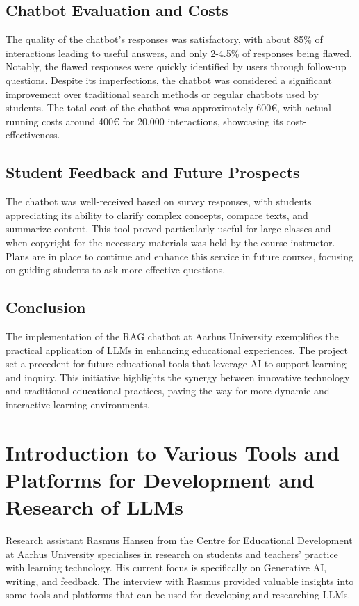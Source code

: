     \subsection*{Chatbot Evaluation and Costs}

    The quality of the chatbot's responses was satisfactory, with about 85\% of interactions leading to useful answers, and only 2-4.5\% of responses being flawed. Notably, the flawed responses were quickly identified by users through follow-up questions. Despite its imperfections, the chatbot was considered a significant improvement over traditional search methods or regular chatbots used by students. The total cost of the chatbot was approximately 600€, with actual running costs around 400€ for 20,000 interactions, showcasing its cost-effectiveness.

    \subsection*{Student Feedback and Future Prospects}

    The chatbot was well-received based on survey responses, with students appreciating its ability to clarify complex concepts, compare texts, and summarize content. This tool proved particularly useful for large classes and when copyright for the necessary materials was held by the course instructor. Plans are in place to continue and enhance this service in future courses, focusing on guiding students to ask more effective questions.

    \subsection*{Conclusion}

    The implementation of the RAG chatbot at Aarhus University exemplifies the practical application of LLMs in enhancing educational experiences. The project set a precedent for future educational tools that leverage AI to support learning and inquiry. This initiative highlights the synergy between innovative technology and traditional educational practices, paving the way for more dynamic and interactive learning environments.

\section*{Introduction to Various Tools and Platforms for Development and Research of LLMs}
    Research assistant Rasmus Hansen from the Centre for Educational Development at Aarhus University specialises in research on students and teachers' practice with learning technology. His current focus is specifically on Generative AI, writing, and feedback. The interview with Rasmus provided valuable insights into some tools and platforms that can be used for developing and researching LLMs.
